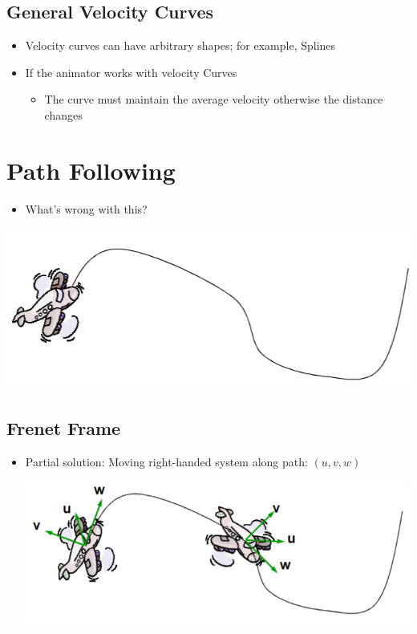 \documentclass{article}
\begin{document}
\subsection*{General Velocity Curves}
\begin{itemize}
    \item Velocity curves can have arbitrary shapes; for example, Splines
    \item If the animator works with velocity Curves
    \begin{itemize}
        \item The curve must maintain the average velocity otherwise the distance changes
    \end{itemize}
\end{itemize}

\section*{Path Following}
\begin{itemize}
    \item What's wrong with this?
\end{itemize}
\begin{center}
    \includegraphics*[scale=0.7]{W4_10.png}
\end{center}
\subsection*{Frenet Frame}
\begin{itemize}
    \item Partial solution: Moving right-handed system along path: $(u, v, w)$
    \begin{center}
        \includegraphics*[scale=0.7]{W4_11.png}
    \end{center}
\end{itemize}
\end{document}
